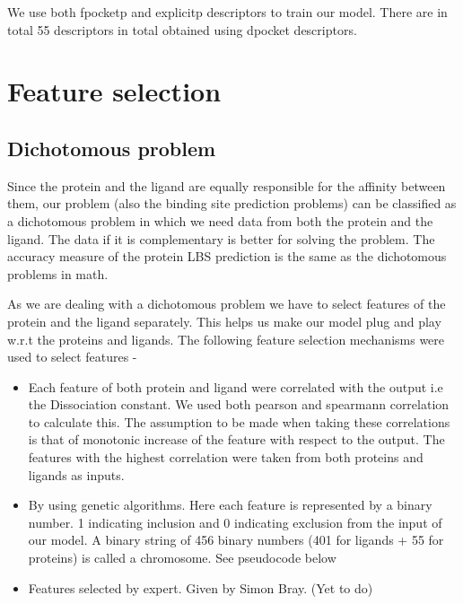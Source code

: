 \documentclass[11pt]{article}
\begin{document}
We use both fpocketp and explicitp descriptors to train our model.
There are in total 55 descriptors in total obtained using dpocket descriptors.



\section{Feature selection}

\subsection{Dichotomous problem}
Since the protein and the ligand are equally responsible for the affinity between them, our problem (also the binding site prediction problems) can be classified as a dichotomous problem in which we need data from both
the protein and the ligand.
The data if it is complementary is better for solving the problem.
The accuracy measure of the protein LBS prediction is the same as the dichotomous problems in math.

As we are dealing with a dichotomous problem we have to select features of the protein and the ligand separately.
This helps us make our model plug and play w.r.t the proteins and ligands.
The following feature selection mechanisms were used to select features -

\begin{itemize}
\item Each feature of both protein and ligand were correlated with the output i.e the Dissociation constant.
We used both pearson and spearmann correlation to calculate this.
The assumption to be made when taking these correlations is that of monotonic increase of
the feature with respect to the output.
The features with the highest correlation were taken from both proteins and ligands as
inputs.
\item By using genetic algorithms\cite{genetic_algorithm}.
Here each feature is represented by a binary number.
1 indicating inclusion and 0 indicating exclusion from the input of our model.
A binary string of 456 binary numbers (401 for ligands + 55 for proteins) is called a chromosome.
See pseudocode below
\item Features selected by expert. Given by Simon Bray. (Yet to do)
\end{itemize}
\end{document}
